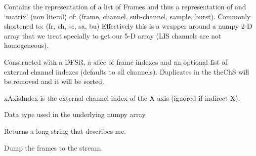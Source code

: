\documentclass[letterpaper,10pt,english]{sphinxmanual}
\begin{document}
\begin{fulllineitems}
\label{\detokenize{ref/LIS/core/FrameSet:TotalDepth.LIS.core.FrameSet.FrameSet}}
Contains the representation of a list of Frames and thus a
representation of and ‘matrix’ (non literal) of:
(frame, channel, sub-channel, sample, burst).
Commonly shortened to: (fr, ch, sc, sa, bu)
Effectively this is a wrapper around a numpy 2-D array that we treat
specially to get our 5-D array (LIS channels are not homogeneous).

Constructed with a DFSR, a slice of frame indexes and an optional
list of external channel indexes (defaults to all channels).
Duplicates in the theChS will be removed and it will be sorted.

xAxisIndex is the external channel index of the X axis (ignored if indirect X).

\begin{fulllineitems}
\label{\detokenize{ref/LIS/core/FrameSet:TotalDepth.LIS.core.FrameSet.FrameSet.NUMPY_DATA_TYPE}}
Data type used in the underlying numpy array.

\end{fulllineitems}


\begin{fulllineitems}
\label{\detokenize{ref/LIS/core/FrameSet:TotalDepth.LIS.core.FrameSet.FrameSet.longStr}}
Returns a long string that describes me.

\end{fulllineitems}


\begin{fulllineitems}
\label{\detokenize{ref/LIS/core/FrameSet:TotalDepth.LIS.core.FrameSet.FrameSet.dumpFrames}}
Dump the frames to the stream.


\end{fulllineitems}
\end{fulllineitems}
\end{document}
